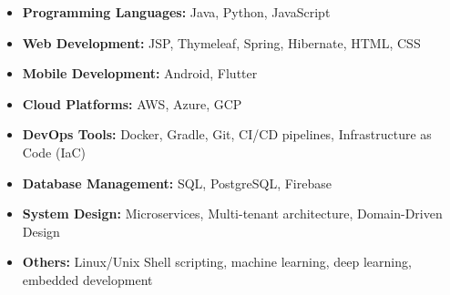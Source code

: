 \documentclass[10pt,a4paper]{article}
\begin{document}
\spacedhrule{0.1em}{-0.8em}
\begin{itemize}
  \item \textbf{Programming Languages:} Java, Python, JavaScript
  \item \textbf{Web Development:} JSP, Thymeleaf, Spring, Hibernate, HTML, CSS 
  \item \textbf{Mobile Development:} Android, Flutter
  \item \textbf{Cloud Platforms:} AWS, Azure, GCP
  \item \textbf{DevOps Tools:} Docker, Gradle, Git, CI/CD pipelines, Infrastructure as Code (IaC)
  \item \textbf{Database Management:} SQL, PostgreSQL, Firebase
  \item \textbf{System Design:} Microservices, Multi-tenant architecture, Domain-Driven Design
  \item \textbf{Others:} Linux/Unix Shell scripting, machine learning, deep learning, embedded development
\end{itemize}


\end{document}
